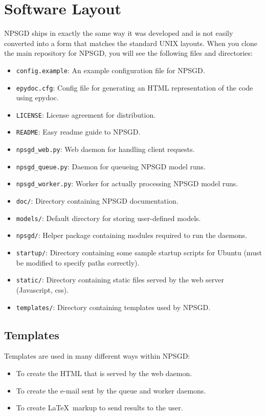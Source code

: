 \documentclass{article}
\newcommand{\mpath}[1]{\texttt{#1}}
\begin{document}
\section{Software Layout}
NPSGD ships in exactly the same way it was developed and is not easily converted
into a form that matches the standard UNIX layouts. When you clone the main
repository for NPSGD, you will see the following files and directories:
\begin{itemize}
    \item \mpath{config.example}: An example configuration file for NPSGD.
    \item \mpath{epydoc.cfg}: Config file for generating an HTML representation
          of the code using epydoc.
    \item \mpath{LICENSE}: License agreement for distribution.
    \item \mpath{README}: Easy readme guide to NPSGD.
    \item \mpath{npsgd\_web.py}: Web daemon for handling client requests.
    \item \mpath{npsgd\_queue.py}: Daemon for queueing NPSGD model runs.
    \item \mpath{npsgd\_worker.py}: Worker for actually processing NPSGD model
          runs.
    \item \mpath{doc/}: Directory containing NPSGD documentation.
    \item \mpath{models/}: Default directory for storing user-defined models.
    \item \mpath{npsgd/}: Helper package containing modules required to run the
          daemons.
    \item \mpath{startup/}: Directory containing some sample startup scripts for
          Ubuntu (must be modified to specify paths correctly).
    \item \mpath{static/}: Directory containing static files served by the web
          server (Javascript, css).
    \item \mpath{templates/}: Directory containing templates used by NPSGD.
\end{itemize}

\subsection{Templates}
Templates are used in many different ways within NPSGD:
\begin{itemize}
    \item To create the HTML that is served by the web daemon.
    \item To create the e-mail sent by the queue and worker daemons.
    \item To create \LaTeX\ markup to send results to the user.
\end{itemize}
\end{document}

